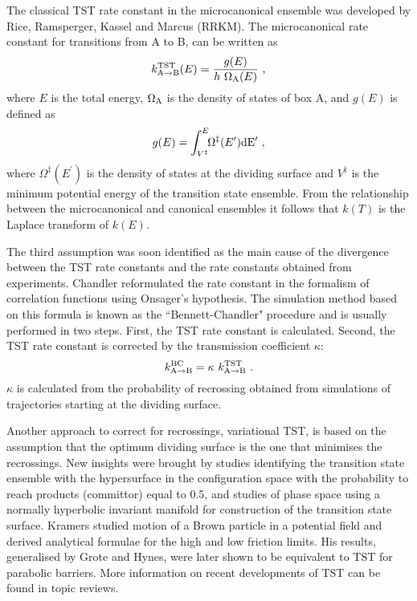 The classical TST rate constant in the microcanonical ensemble was developed by Rice,\cite{Rice1927} Ramsperger,\cite{Rice1928} Kassel\cite{Kassel1928} and Marcus\cite{Marcus1956} (RRKM).
The microcanonical rate constant for transitions from A to B, can be written as
\begin{equation}
\label{eq:rrkm}
k^{\rm TST}_{\rm A\rightarrow B}(E) = \frac{g(E)}{h ~ \Omega_{\rm A}(E)} ~ ,
\end{equation}
where $E$ is the total energy, $\Omega_{\rm A}$ is the density of states of box A, and $g(E)$ is defined as
\begin{equation}
\label{eq:g}
g(E) = \int_{V^\ddagger}^E \!\! \Omega^\ddagger (E^\prime) \rm d E^{\prime} ~ ,
\end{equation}
where $\Omega^\ddagger (E^\prime)$ is the density of states at the dividing surface
and $V^\ddagger$ is the minimum potential energy of the transition state ensemble.
From the relationship between the microcanonical and canonical ensembles it follows that $k(T)$ is the Laplace transform of $k(E)$.

The third assumption was soon identified as the main cause of the divergence between the TST rate constants and the rate constants obtained from experiments.
Chandler reformulated the rate constant\cite{Chandler1978} in the formalism of correlation \mbox{functions\cite{Kubo1957}} using Onsager's hypothesis.\cite{Onsager1931a, Onsager1931b}
The simulation method based on this formula is known as the ``Bennett-Chandler" procedure\cite{Frenkel2002} and is usually performed in two steps.
First, the TST rate constant is calculated.
Second, the TST rate constant is corrected by the transmission coefficient $\kappa$:
\begin{equation}
\label{eq:bc-k}
k^{\rm BC}_{\rm A\rightarrow B} = \kappa ~ k^{\rm TST}_{\rm A\rightarrow B} ~.
\end{equation}
$\kappa$ is calculated from the probability of recrossing obtained from simulations of trajectories starting at the dividing surface.

Another approach to correct for recrossings, variational TST,\cite{Truhlar1980, Fast1998} is based on the assumption that the optimum dividing surface is the one that minimises the recrossings.
New insights were brought by studies identifying the transition state ensemble with the hypersurface in the configuration space with the probability to reach products (committor) equal to 0.5,\cite{Pratt1986} and studies of phase space using a normally hyperbolic invariant manifold\cite{Uzer2002, Ezra2009} for construction of the transition state surface.
Kramers studied motion of a Brown particle in a potential field \cite{Kramers1940} and derived analytical formulae for the high and low friction limits.
His results, generalised by Grote and Hynes,\cite{Grote1980} were later shown\cite{Pollak1986} to be equivalent to TST for parabolic barriers.
More information on recent developments of TST can be found in topic reviews.\cite{Truhlar1996, Pollak2005, Vanden-Eijnden2005}

